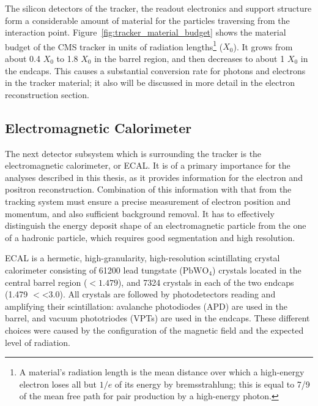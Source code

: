 
The silicon detectors of the tracker, the readout electronics and support structure form a considerable amount of
material for the particles traversing from the interaction point. Figure~\ref{fig:tracker_material_budget}
\autocite{CMS} shows the material budget of the CMS tracker in units of radiation lengths\footnote{A material's
radiation length is the mean distance over which a high-energy electron loses all but $1/e$ of its energy by
bremsstrahlung; this is equal to \num{7/9} of the mean free path for pair production by a high-energy photon.} ($X_0$).
It grows from about \num{0.4} $X_0$ to \num{1.8} $X_0$ in the barrel region, and then decreases to about \num{1} $X_0$
in the endcaps. This causes a substantial conversion rate for photons and electrons in the tracker material; it also
will be discussed in more detail in the electron reconstruction section.


\subsection{Electromagnetic Calorimeter}
The next detector subsystem which is surrounding the tracker is the electromagnetic calorimeter, or ECAL. It is of a
primary importance for the analyses described in this thesis, as it provides information for the electron and positron
reconstruction. Combination of this information with that from the tracking system must ensure a precise measurement of
electron position and momentum, and also sufficient background removal. It has to effectively distinguish the energy
deposit shape of an electromagnetic particle from the one of a hadronic particle, which requires good segmentation and
high resolution.

ECAL is a hermetic, high-granularity, high-resolution scintillating crystal calorimeter consisting of \num{61200} lead
tungstate ($\textrm{PbWO}_4$) crystals located in the central barrel region (\abs\eta $<1.479$), and \num{7324} crystals
in each of the two endcaps (\num{1.479} $<$\abs\eta\num{<3.0}). All crystals are followed by photodetectors reading and
amplifying their scintillation: avalanche photodiodes (APD) are used in the barrel, and vacuum phototriodes (VPTs) are
used in the endcaps. These different choices were caused by the configuration of the magnetic field and the expected
level of radiation.

